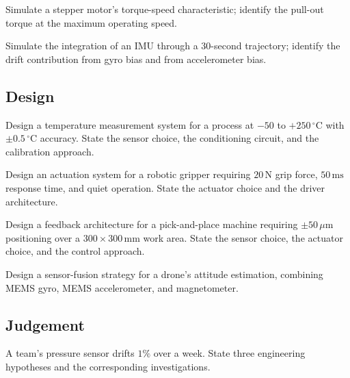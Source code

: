 \begin{exercise}
Simulate a stepper motor's torque-speed characteristic; identify the pull-out torque at the maximum operating speed.
\end{exercise}

\begin{exercise}
Simulate the integration of an IMU through a $30$-second trajectory; identify the drift contribution from gyro bias and from accelerometer bias.
\end{exercise}

\subsection*{Design}

\begin{exercise}
Design a temperature measurement system for a process at $-50$ to $+250\,^\circ\text{C}$ with $\pm 0.5\,^\circ\text{C}$ accuracy. State the sensor choice, the conditioning circuit, and the calibration approach.
\end{exercise}

\begin{exercise}
Design an actuation system for a robotic gripper requiring $20\,\text{N}$ grip force, $50\,\text{ms}$ response time, and quiet operation. State the actuator choice and the driver architecture.
\end{exercise}

\begin{exercise}
Design a feedback architecture for a pick-and-place machine requiring $\pm 50\,\mu\text{m}$ positioning over a $300 \times 300\,\text{mm}$ work area. State the sensor choice, the actuator choice, and the control approach.
\end{exercise}

\begin{exercise}
Design a sensor-fusion strategy for a drone's attitude estimation, combining MEMS gyro, MEMS accelerometer, and magnetometer.
\end{exercise}

\subsection*{Judgement}

\begin{exercise}
A team's pressure sensor drifts $1\%$ over a week. State three engineering hypotheses and the corresponding investigations.
\end{exercise}


